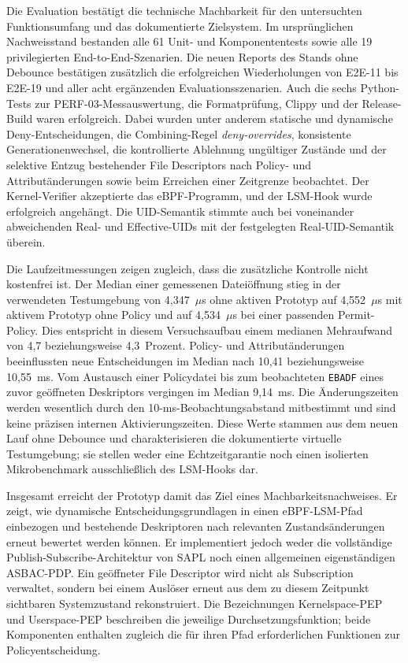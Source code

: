 Die Evaluation bestätigt die technische Machbarkeit für den untersuchten Funktionsumfang und das dokumentierte Zielsystem. Im ursprünglichen Nachweisstand bestanden alle 61 Unit- und Komponententests sowie alle 19 privilegierten End-to-End-Szenarien. Die neuen Reports des Stands ohne Debounce bestätigen zusätzlich die erfolgreichen Wiederholungen von E2E-11 bis E2E-19 und aller acht ergänzenden Evaluationsszenarien. Auch die sechs Python-Tests zur PERF-03-Messauswertung, die Formatprüfung, Clippy und der Release-Build waren erfolgreich. Dabei wurden unter anderem statische und dynamische Deny-Entscheidungen, die Combining-Regel \emph{deny-overrides}, konsistente Generationenwechsel, die kontrollierte Ablehnung ungültiger Zustände und der selektive Entzug bestehender File Descriptors nach Policy- und Attributänderungen sowie beim Erreichen einer Zeitgrenze beobachtet. Der Kernel-Verifier akzeptierte das eBPF-Programm, und der LSM-Hook wurde erfolgreich angehängt. Die UID-Semantik stimmte auch bei voneinander abweichenden Real- und Effective-UIDs mit der festgelegten Real-UID-Semantik überein.

Die Laufzeitmessungen zeigen zugleich, dass die zusätzliche Kontrolle nicht kostenfrei ist. Der Median einer gemessenen Dateiöffnung stieg in der verwendeten Testumgebung von 4,347~$\mu$s ohne aktiven Prototyp auf 4,552~$\mu$s mit aktivem Prototyp ohne Policy und auf 4,534~$\mu$s bei einer passenden Permit-Policy. Dies entspricht in diesem Versuchsaufbau einem medianen Mehraufwand von 4,7 beziehungsweise 4,3~Prozent. Policy- und Attributänderungen beeinflussten neue Entscheidungen im Median nach 10,41 beziehungsweise 10,55~ms. Vom Austausch einer Policydatei bis zum beobachteten \texttt{EBADF} eines zuvor geöffneten Deskriptors vergingen im Median 9,14~ms. Die Änderungszeiten werden wesentlich durch den 10-ms-Beobachtungsabstand mitbestimmt und sind keine präzisen internen Aktivierungszeiten. Diese Werte stammen aus dem neuen Lauf ohne Debounce und charakterisieren die dokumentierte virtuelle Testumgebung; sie stellen weder eine Echtzeitgarantie noch einen isolierten Mikrobenchmark ausschließlich des LSM-Hooks dar.

Insgesamt erreicht der Prototyp damit das Ziel eines Machbarkeitsnachweises. Er zeigt, wie dynamische Entscheidungsgrundlagen in einen eBPF-LSM-Pfad einbezogen und bestehende Deskriptoren nach relevanten Zustandsänderungen erneut bewertet werden können. Er implementiert jedoch weder die vollständige Publish-Subscribe-Architektur von SAPL noch einen allgemeinen eigenständigen ASBAC-PDP. Ein geöffneter File Descriptor wird nicht als Subscription verwaltet, sondern bei einem Auslöser erneut aus dem zu diesem Zeitpunkt sichtbaren Systemzustand rekonstruiert. Die Bezeichnungen Kernelspace-PEP und Userspace-PEP beschreiben die jeweilige Durchsetzungsfunktion; beide Komponenten enthalten zugleich die für ihren Pfad erforderlichen Funktionen zur Policyentscheidung.

